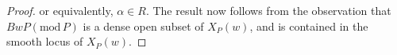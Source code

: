 \documentclass[paper=a4, fontsize=10pt]{amsart} %
\theoremstyle{plain}
\theoremstyle{definition}
\theoremstyle{remark}
\numberwithin{equation}{section} %
\numberwithin{figure}{section} %
\numberwithin{table}{section} %
\numberwithin{subsection}{section} %
\def\mid{\,\middle\vert\,}
\def\borel{\ensuremath{B}}
\def\roots{\ensuremath{\Delta_0}}
\def\proots{\ensuremath{\Delta_0^+}}
\def\Roots{\ensuremath{\Delta}}
\def\lgl{\ensuremath{\mathfrak g}}
\def\u{\ensuremath{\mathfrak u}}
\def\mod{\ensuremath{\mathrm{mod}\,}}
\begin{document}
\begin{proof}
or equivalently, $\alpha\in R$.
The result now follows from the observation that $BwP(\mod P)$ is a dense open subset of $X_P(w)$, and is contained in the smooth locus of $X_P(w)$.
\end{proof}
\end{document}
